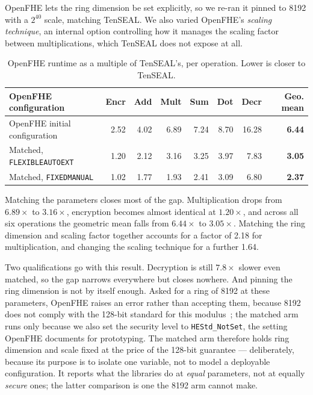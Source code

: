 \documentclass[11pt,a4paper]{article}
\begin{document}
OpenFHE lets the ring dimension be set explicitly, so we re-ran it pinned to 8192
with a $2^{40}$ scale, matching TenSEAL. We also varied OpenFHE's \emph{scaling
technique}, an internal option controlling how it manages the scaling factor between
multiplications, which TenSEAL does not expose at all.

\begin{table}[H]\centering\small
\begin{tabular}{@{}lrrrrrrr@{}}
\toprule
\textbf{OpenFHE configuration} & \textbf{Encr} & \textbf{Add} & \textbf{Mult} &
\textbf{Sum} & \textbf{Dot} & \textbf{Decr} & \textbf{Geo. mean} \\
\midrule
OpenFHE initial configuration                & 2.52 & 4.02 & 6.89 & 7.24 & 8.70 & 16.28 & \textbf{6.44} \\
Matched, \texttt{FLEXIBLEAUTOEXT}            & 1.20 & 2.12 & 3.16 & 3.25 & 3.97 & 7.83  & \textbf{3.05} \\
Matched, \texttt{FIXEDMANUAL}                & 1.02 & 1.77 & 1.93 & 2.41 & 3.09 & 6.80  & \textbf{2.37} \\
\bottomrule
\end{tabular}
\caption{OpenFHE runtime as a multiple of TenSEAL's, per operation. Lower is closer
to TenSEAL.}
\end{table}

Matching the parameters closes most of the gap. Multiplication drops from
$6.89\times$ to $3.16\times$, encryption becomes almost identical at $1.20\times$,
and across all six operations the geometric mean falls from $6.44\times$ to
$3.05\times$. Matching the ring dimension and scaling factor together accounts for a factor of
2.18 for multiplication, and changing the scaling technique for a further 1.64.

Two qualifications go with this result. Decryption is still $7.8\times$ slower even
matched, so the gap narrows everywhere but closes nowhere. And pinning the ring
dimension is not by itself enough. Asked for a ring of 8192 at these parameters,
OpenFHE raises an error rather than accepting them, because 8192 does not comply
with the 128-bit standard for this modulus~\cite{hestandard}; the matched arm runs
only because we also set the security level to \texttt{HEStd\_NotSet}, the setting
OpenFHE documents for prototyping. The matched arm therefore holds ring dimension and scale fixed at the price of the
128-bit guarantee --- deliberately, because its purpose is to isolate one variable,
not to model a deployable configuration. It reports what the libraries do at
\emph{equal} parameters, not at equally \emph{secure} ones; the latter comparison is
one the 8192 arm cannot make.
\end{document}
